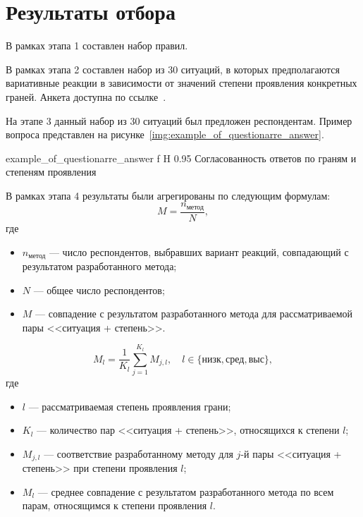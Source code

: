 
\section{Результаты отбора}

В рамках этапа 1 составлен набор правил.

В рамках этапа 2 составлен набор из 30 ситуаций, в которых предполагаются вариативные реакции в зависимости от значений степени проявления конкретных граней. Анкета доступна по ссылке~\cite{questionarree}.

На этапе 3 данный набор из 30 ситуаций был предложен респондентам.
	Пример вопроса представлен на рисунке~\ref{img:example_of_questionarre_answer}.

	{example_of_questionarre_answer}
	{f}
	{H}
	{0.95\textwidth}
	{Согласованность ответов по граням и степеням проявления}

В рамках этапа 4 результаты были агрегированы по следующим формулам:
		\begin{equation}
			\label{eq:research_method_match}
			M = \frac{n_{\text{метод}}}{N},
		\end{equation}
		где
		\begin{itemize}
			\item \(n_{\text{метод}}\) --- число респондентов, выбравших вариант реакций, совпадающий с результатом разработанного метода;
			\item \(N\) --- общее число респондентов;
			\item \(M\) --- совпадение с результатом разработанного метода для рассматриваемой пары <<ситуация + степень>>.
		\end{itemize}

		\begin{equation}
			\label{eq:research_level_method_match}
			M_l = \frac{1}{K_l} \sum_{j = 1}^{K_l} M_{j,l}, \quad l \in \{\text{низк}, \text{сред}, \text{выс}\},
		\end{equation}
		где
		\begin{itemize}
			\item \(l\) --- рассматриваемая степень проявления грани;
			\item \(K_l\) --- количество пар <<ситуация + степень>>, относящихся к степени \(l\);
			\item \(M_{j,l}\) --- соответствие разработанному методу для \(j\)-й пары <<ситуация + степень>> при степени проявления \(l\);
			\item \(M_l\) --- среднее совпадение с результатом разработанного метода по всем парам, относящимся к степени проявления \(l\).
		\end{itemize}

